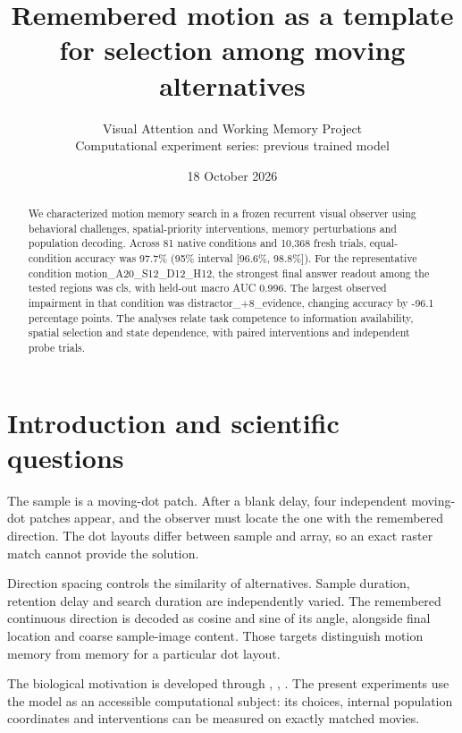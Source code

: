 \documentclass[11pt]{article}
\begin{document}
\title{\color{ink}Remembered motion as a template for selection among moving alternatives}
\author{Visual Attention and Working Memory Project\\Computational experiment series: previous trained model}\date{18 October 2026}\maketitle
\begin{abstract}
We characterized motion memory search in a frozen recurrent visual observer using behavioral challenges, spatial-priority interventions, memory perturbations and population decoding. Across 81 native conditions and 10,368 fresh trials, equal-condition accuracy was 97.7\% (95\% interval [96.6\%, 98.8\%]). For the representative condition motion\_\allowbreak{}A20\_\allowbreak{}S12\_\allowbreak{}D12\_\allowbreak{}H12, the strongest final answer readout among the tested regions was cls, with held-out macro AUC 0.996. The largest observed impairment in that condition was distractor\_\allowbreak{}+8\_\allowbreak{}evidence, changing accuracy by -96.1 percentage points. The analyses relate task competence to information availability, spatial selection and state dependence, with paired interventions and independent probe trials.
\end{abstract}
\section{Introduction and scientific questions}
The sample is a moving-dot patch. After a blank delay, four independent moving-dot patches appear, and the observer must locate the one with the remembered direction. The dot layouts differ between sample and array, so an exact raster match cannot provide the solution.

Direction spacing controls the similarity of alternatives. Sample duration, retention delay and search duration are independently varied. The remembered continuous direction is decoded as cosine and sine of its angle, alongside final location and coarse sample-image content. Those targets distinguish motion memory from memory for a particular dot layout.

The biological motivation is developed through \cite{salzman}, \cite{it}, \cite{spatial}. The present experiments use the model as an accessible computational subject: its choices, internal population coordinates and interventions can be measured on exactly matched movies.
\end{document}
